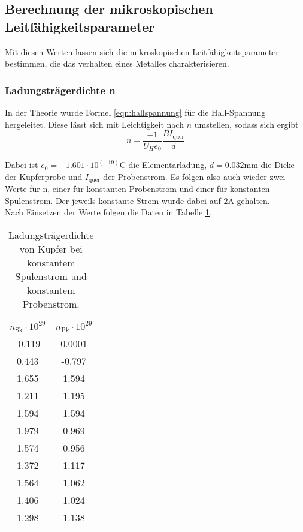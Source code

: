 \noindent 

\subsection{Berechnung der mikroskopischen Leitfähigkeitsparameter}

Mit diesen Werten lassen sich die mikroskopischen Leitfähigkeitsparameter bestimmen, die das verhalten eines Metalles charakterisieren.

\subsubsection{Ladungsträgerdichte n}
In der Theorie wurde Formel \eqref{eqn:hallspannung} für die Hall-Spannung hergeleitet.
Diese lässt sich mit Leichtigkeit nach $n$ umstellen, sodass sich ergibt
\begin{equation*}
n = \frac{-1}{U_H e_0} \frac{B I_\text{quer}}{d}
\end{equation*}

Dabei ist $e_0 = -1.601 \cdot 10^(-19)\si{\coulomb}$ die Elementarladung, $d = 0.032 \si{\milli\meter}$ die Dicke der Kupferprobe
und $I_\text{quer}$ der Probenstrom.
Es folgen also auch wieder zwei Werte für n, einer für konstanten Probenstrom und einer für
konstanten Spulenstrom. Der jeweils konstante Strom wurde dabei auf $2 \si{\ampere}$ gehalten.\\
Nach Einsetzen der Werte folgen die Daten in Tabelle \ref{tab:nnn}.

\begin{table}
 \centering
 \label{tab:nnn}
 \caption{Ladungsträgerdichte von Kupfer bei konstantem Spulenstrom und konstantem Probenstrom.}
 \begin{tabular}{c c}
  \toprule
  $n_\text{Sk} \cdot 10^{29}$ & $n_\text{Pk} \cdot 10^{29}$ \\
  \midrule
   -0.119& 0.0001\\
   0.443 & -0.797\\  
   1.655 & 1.594\\
   1.211 & 1.195\\
   1.594 & 1.594\\
   1.979 & 0.969\\
   1.574 & 0.956\\
   1.372 & 1.117\\       
   1.564 & 1.062\\
   1.406 & 1.024\\
   1.298 & 1.138\\   
  \bottomrule
 \end{tabular}
\end{table} 

